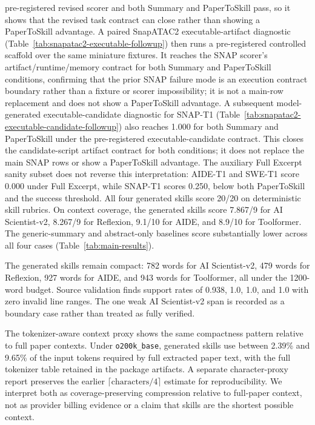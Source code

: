 \documentclass[letterpaper]{article}
\begin{document}
pre-registered revised scorer and both Summary and PaperToSkill pass, so it
shows that the revised task contract can close rather than showing a
PaperToSkill advantage. A paired SnapATAC2 executable-artifact diagnostic
(Table~\ref{tab:snapatac2-executable-followup}) then runs a pre-registered
controlled scaffold over the same miniature fixtures. It reaches the SNAP
scorer's artifact/runtime/memory contract for both Summary and PaperToSkill
conditions, confirming that the prior SNAP failure mode is an execution
contract boundary rather than a fixture or scorer impossibility; it is not a
main-row replacement and does not show a PaperToSkill advantage. A subsequent
model-generated executable-candidate diagnostic for SNAP-T1
(Table~\ref{tab:snapatac2-executable-candidate-followup}) also reaches 1.000
for both Summary and PaperToSkill under the pre-registered executable-candidate
contract. This closes the candidate-script artifact contract for both
conditions; it does not replace the main SNAP rows or show a PaperToSkill
advantage. The auxiliary Full Excerpt sanity subset does not reverse this
interpretation: AIDE-T1 and SWE-T1 score 0.000 under Full Excerpt, while
SNAP-T1 scores 0.250, below both PaperToSkill and the success threshold.
All four generated skills score 20/20 on deterministic skill rubrics. On context
coverage, the generated skills score 7.867/9 for AI Scientist-v2, 8.267/9 for
Reflexion, 9.1/10 for AIDE, and 8.9/10 for Toolformer. The generic-summary and
abstract-only baselines score substantially lower across all four cases
(Table~\ref{tab:main-results}).

The generated skills remain compact: 782 words for AI Scientist-v2, 479 words
for Reflexion, 927 words for AIDE, and 943 words for Toolformer, all under the
1200-word budget. Source validation finds support rates of 0.938, 1.0, 1.0,
and 1.0 with zero invalid line ranges. The one weak AI Scientist-v2 span is
recorded as a boundary case rather than treated as fully verified.

The tokenizer-aware context proxy shows the same compactness pattern relative
to full paper contexts. Under \texttt{o200k\_base}, generated skills use between
2.39\% and 9.65\% of the input tokens required by full extracted paper text,
with the full tokenizer table retained in the package artifacts. A separate
character-proxy report preserves the earlier
$\lceil\mathrm{characters}/4\rceil$ estimate for reproducibility. We interpret
both as coverage-preserving compression relative to full-paper context, not as
provider billing evidence or a claim that skills are the shortest possible
context.
\end{document}
